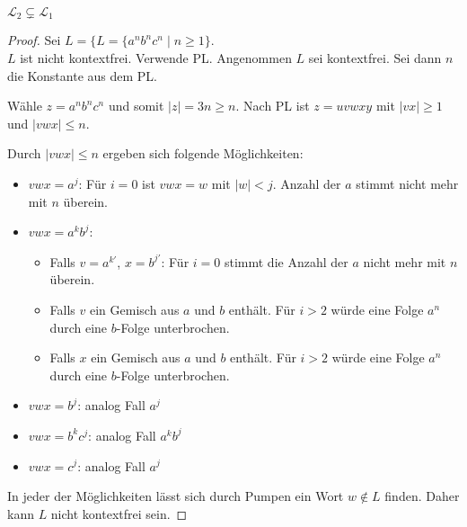 \begin{lemma} %
	$\mathcal{L}_2 \subsetneq \mathcal{L}_1$
\end{lemma}
\begin{proof}
	Sei $L=\{L=\{a^nb^nc^n \mid n\geq 1\}$.\\
	$L$ ist nicht kontextfrei. Verwende \ac{PL}. Angenommen $L$ sei kontextfrei.
	Sei dann $n$ die Konstante aus dem \ac{PL}.
	
	Wähle $z=a^nb^nc^n$ und somit $|z| = 3n \ge n$.
  Nach PL ist $z = uvwxy$ mit $|vx| \ge 1$ und $|vwx| \le n$.

  Durch $|vwx| \le n$ ergeben sich folgende Möglichkeiten:
  \begin{itemize}
  \item $vwx = a^j$: 
    Für $i=0$ ist $vwx=w$ mit $|w| < j$.
    Anzahl der $a$ stimmt nicht mehr mit $n$ überein.
  \item $vwx = a^kb^j$:
    \begin{itemize}
    \item Falls $v = a^{k'}$, $x = b^{j'}$: Für $i=0$ stimmt die Anzahl der $a$ nicht mehr mit $n$ überein.
    \item Falls $v$ ein Gemisch aus $a$ und $b$ enthält.
      Für $i>2$ würde eine Folge $a^n$ durch eine $b$-Folge unterbrochen.
    \item Falls $x$ ein Gemisch aus $a$ und $b$ enthält.
      Für $i>2$ würde eine Folge $a^n$ durch eine $b$-Folge unterbrochen.
    \end{itemize}
  \item $vwx = b^j$: analog Fall $a^j$
  \item $vwx = b^kc^j$: analog Fall $a^kb^j$
  \item $vwx = c^j$: analog Fall $a^j$
  \end{itemize}
  In jeder der Möglichkeiten lässt sich durch Pumpen ein Wort $w \not \in L$ finden.
  Daher kann $L$ nicht kontextfrei sein.
\end{proof}

